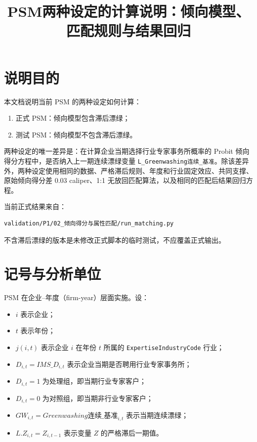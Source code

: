 \documentclass[12pt,a4paper]{article}
\title{PSM两种设定的计算说明：倾向模型、匹配规则与结果回归}
\author{}
\date{}
\begin{document}
\maketitle
\tableofcontents
\newpage

\section{说明目的}

本文档说明当前 PSM 的两种设定如何计算：

\begin{enumerate}[label=(\arabic*)]
    \item 正式 PSM：倾向模型包含滞后漂绿；
    \item 测试 PSM：倾向模型不包含滞后漂绿。
\end{enumerate}

两种设定的唯一差异是：在计算企业当期选择行业专家事务所概率的 Probit 倾向得分方程中，是否纳入上一期连续漂绿变量 \texttt{L\_Greenwashing连续\_基准}。除该差异外，两种设定使用相同的数据、严格滞后规则、年度和行业固定效应、共同支撑、原始倾向得分差 $0.03$ caliper、1:1 无放回匹配算法，以及相同的匹配后结果回归方程。

当前正式结果来自：

\begin{verbatim}
validation/P1/02_倾向得分与属性匹配/run_matching.py
\end{verbatim}

不含滞后漂绿的版本是未修改正式脚本的临时测试，不应覆盖正式输出。

\section{记号与分析单位}

PSM 在企业--年度（firm-year）层面实施。设：

\begin{itemize}
    \item $i$ 表示企业；
    \item $t$ 表示年份；
    \item $j(i,t)$ 表示企业 $i$ 在年份 $t$ 所属的 \texttt{ExpertiseIndustryCode} 行业；
    \item $D_{i,t}=IMS\_D_{i,t}$ 表示企业当期是否聘用行业专家事务所；
    \item $D_{i,t}=1$ 为处理组，即当期行业专家客户；
    \item $D_{i,t}=0$ 为对照组，即当期非行业专家客户；
    \item $GW_{i,t}=Greenwashing连续\_基准_{i,t}$ 表示当期连续漂绿；
    \item $L.Z_{i,t}=Z_{i,t-1}$ 表示变量 $Z$ 的严格滞后一期值。
\end{itemize}
\end{document}
